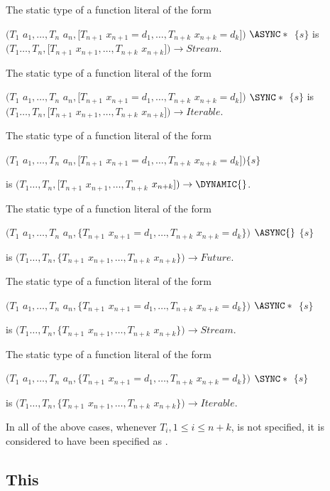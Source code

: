 \documentclass{article}
\begin{document}
\LMHash{}
The static type of a function literal of the form

$(T_1$ $a_1, \ldots, T_n$ $a_n, [T_{n+1}$ $x_{n+1} = d_1, \ldots, T_{n+k}$ $x_{n+k}= d_k])$ $ \ASYNC*{}$ $\{s\}$
is $(T_1 \ldots, T_n, [T_{n+1}$ $x_{n+1}, \ldots, T_{n+k}$ $x_{n+k}]) \rightarrow Stream$.

\LMHash{}
The static type of a function literal of the form

$(T_1$ $a_1, \ldots, T_n$ $a_n, [T_{n+1}$ $x_{n+1} = d_1, \ldots, T_{n+k}$ $x_{n+k}= d_k])$ $ \SYNC*{}$ $\{s\}$
is $(T_1 \ldots, T_n, [T_{n+1}$ $x_{n+1}, \ldots, T_{n+k}$ $x_{n+k}]) \rightarrow Iterable$.

\LMHash{}
The static type of a function literal of the form

$(T_1$ $a_1, \ldots, T_n$ $a_n, [T_{n+1}$ $x_{n+1} = d_1, \ldots, T_{n+k}$ $x_{n+k}= d_k])\{s\}$

is $(T_1 \ldots, T_n, [T_{n+1}$ $x_{n+1}, \ldots, T_{n+k}$ $x_{n+k}]) \rightarrow \DYNAMIC{}$.

\LMHash{}
The static type of a function literal of the form

$(T_1$ $a_1, \ldots, T_n$ $a_n, \{T_{n+1}$ $x_{n+1} = d_1, \ldots, T_{n+k}$ $x_{n+k} = d_k\})$ $\ASYNC{}$ $\{s\}$

is $(T_1 \ldots, T_n, \{T_{n+1}$ $x_{n+1}, \ldots, T_{n+k}$ $x_{n+k}\}) \rightarrow Future{}$.

\LMHash{}
The static type of a function literal of the form

$(T_1$ $a_1, \ldots, T_n$ $a_n, \{T_{n+1}$ $x_{n+1} = d_1, \ldots, T_{n+k}$ $x_{n+k} = d_k\})$ $\ASYNC*{}$ $\{s\}$

is $(T_1 \ldots, T_n, \{T_{n+1}$ $x_{n+1}, \ldots, T_{n+k}$ $x_{n+k}\}) \rightarrow Stream{}$.

\LMHash{}
The static type of a function literal of the form

$(T_1$ $a_1, \ldots, T_n$ $a_n, \{T_{n+1}$ $x_{n+1} = d_1, \ldots, T_{n+k}$ $x_{n+k} = d_k\})$ $\SYNC*{}$ $\{s\}$

is $(T_1 \ldots, T_n, \{T_{n+1}$ $x_{n+1}, \ldots, T_{n+k}$ $x_{n+k}\}) \rightarrow Iterable{}$.

\LMHash{}
In all of the above cases, whenever $T_i, 1 \le i \le n+k$, is not specified, it is considered to have been specified as \DYNAMIC{}.


\subsection{This}
\end{document}
